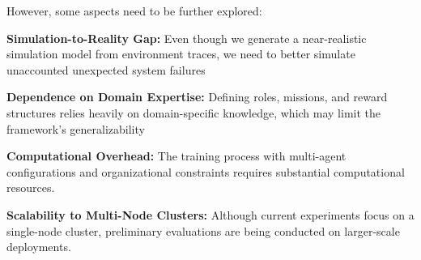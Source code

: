 However, some aspects need to be further explored:
\begin{enumerate*}[label=\textbf{\arabic*)}, itemjoin={;\quad }]
  \item \textbf{Simulation-to-Reality Gap:} Even though we generate a near-realistic simulation model from environment traces, we need to better simulate unaccounted unexpected system failures
  \item \textbf{Dependence on Domain Expertise:} Defining roles, missions, and reward structures relies heavily on domain-specific knowledge, which may limit the framework's generalizability
  \item \textbf{Computational Overhead:} The training process with multi-agent configurations and organizational constraints requires substantial computational resources.
  \item \textbf{Scalability to Multi-Node Clusters:} Although current experiments focus on a single-node cluster, preliminary evaluations are being conducted on larger-scale deployments.

\end{enumerate*}


